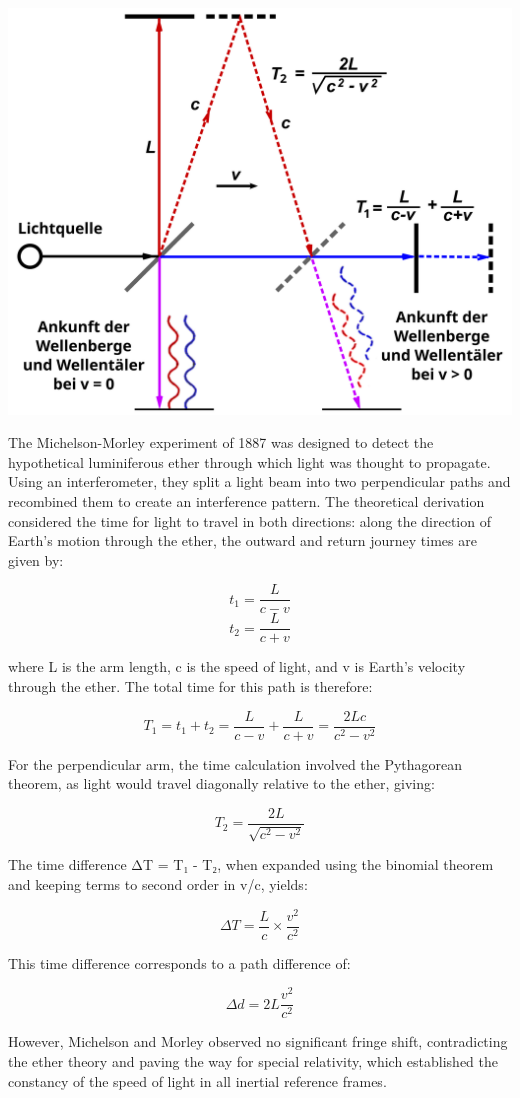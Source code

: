 \documentclass[
  a4paper,
]{book}
\begin{document}
\begin{tcolorbox}[enhanced jigsaw, coltitle=black, title=\textcolor{quarto-callout-note-color}{\faInfo}\hspace{0.5em}{Michelson Morley Experiment}, colframe=quarto-callout-note-color-frame, toprule=.15mm, opacitybacktitle=0.6, left=2mm, opacityback=0, breakable, toptitle=1mm, bottomtitle=1mm, leftrule=.75mm, arc=.35mm, titlerule=0mm, colbacktitle=quarto-callout-note-color!10!white, rightrule=.15mm, bottomrule=.15mm, colback=white]

\includegraphics[width=0.6\linewidth,height=\textheight,keepaspectratio]{electromagnetic-waves/img/michelson_morley.png}

The Michelson-Morley experiment of 1887 was designed to detect the
hypothetical luminiferous ether through which light was thought to
propagate. Using an interferometer, they split a light beam into two
perpendicular paths and recombined them to create an interference
pattern. The theoretical derivation considered the time for light to
travel in both directions: along the direction of Earth's motion through
the ether, the outward and return journey times are given by:

\[t_1 = \frac{L}{c-v}\] \[t_2 = \frac{L}{c+v}\]

where L is the arm length, c is the speed of light, and v is Earth's
velocity through the ether. The total time for this path is therefore:

\[T_1 = t_1 + t_2 = \frac{L}{c-v} + \frac{L}{c+v} = \frac{2Lc}{c^2-v^2}\]

For the perpendicular arm, the time calculation involved the Pythagorean
theorem, as light would travel diagonally relative to the ether, giving:

\[T_2 = \frac{2L}{\sqrt{c^2-v^2}}\]

The time difference ΔT = T₁ - T₂, when expanded using the binomial
theorem and keeping terms to second order in v/c, yields:

\[\Delta T = \frac{L}{c} \times \frac{v^2}{c^2}\]

This time difference corresponds to a path difference of:

\[\Delta d = 2L\frac{v^2}{c^2}\]

However, Michelson and Morley observed no significant fringe shift,
contradicting the ether theory and paving the way for special
relativity, which established the constancy of the speed of light in all
inertial reference frames.

\end{tcolorbox}
\end{document}
